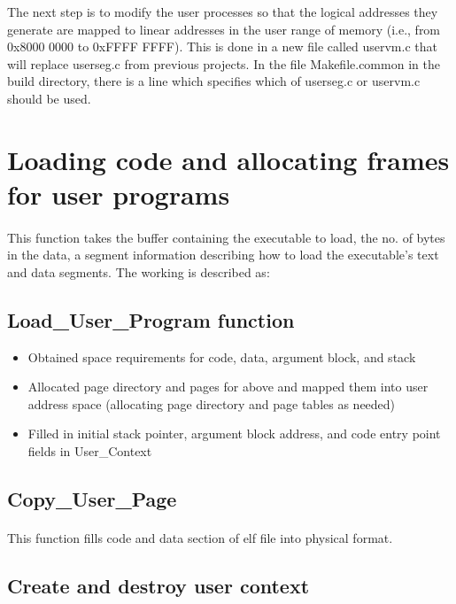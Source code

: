 \documentclass[11pt]{article}
\begin{document}
The next step is to modify the user processes so that the logical addresses they generate are mapped to linear addresses in the user range of memory (i.e., from 0x8000 0000 to 0xFFFF FFFF). This is done in a  new file called uservm.c that will replace userseg.c from previous projects. In the file Makefile.common in the build directory, there is a line which specifies which of userseg.c or uservm.c should be used.

\section{Loading code and allocating frames for user programs}
\paragraph{}

This function takes the buffer containing the executable to load, the no. of bytes in the data, a segment information describing how to load the executable's text and data segments. The working is described as:

\subsection{Load\_User\_Program function}
\begin{itemize}
\item Obtained space requirements for code, data, argument block, and stack
\item Allocated page directory and pages for above and mapped them into user address space (allocating page directory and page tables as needed)
\item Filled in initial stack pointer, argument block address, and code entry point fields in User\_Context
\end{itemize}

\subsection{Copy\_User\_Page}
\paragraph{}
This function fills code and data section of elf file into physical format.

\subsection{Create and destroy user context}
\end{document}
